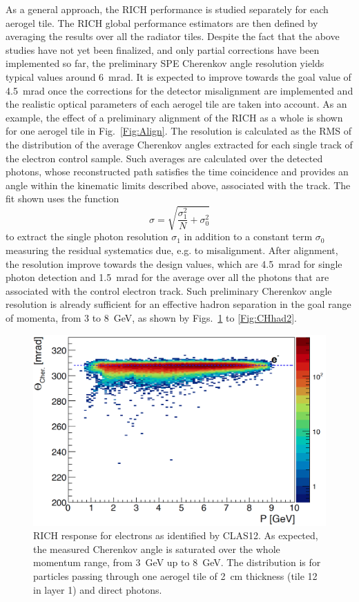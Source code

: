 \documentclass[5p,times,twocolumn]{elsarticle}
\begin{document}
As a general approach, the RICH performance is studied separately for each aerogel tile.
The RICH global performance estimators are then defined by averaging the results over all the
radiator tiles. 
Despite the fact that the above studies have not yet been finalized, and only partial corrections have been
implemented so far, the preliminary SPE Cherenkov angle resolution yields typical values around 6~mrad. It is expected to improve
towards the goal value of 4.5~mrad once the corrections for the detector misalignment are implemented and the
realistic optical parameters of each aerogel tile are taken into account. As an example, the effect of a preliminary
alignment of the RICH as a whole is shown for one aerogel tile in Fig.~\ref{Fig:Align}. The
resolution is calculated as the RMS of the distribution of the average Cherenkov angles extracted for 
each single track of the electron control sample. Such averages are calculated 
over the detected photons, whose reconstructed path satisfies the time coincidence and provides an angle within the 
kinematic limits described above, associated with the track. The fit shown uses the function
$$\sigma = \sqrt{\frac{\sigma_1^2}{N}+\sigma_0^2}$$ to extract the single photon resolution $\sigma_1$ in addition to
a constant term $\sigma_0$ measuring the residual systematics due, e.g. to misalignment.
After alignment, the resolution improve towards
the design values, which are 4.5~mrad for single photon detection and 1.5~mrad for the average over all the photons 
that are associated with the control electron track. Such preliminary Cherenkov angle resolution is already sufficient for an effective hadron
separation in the goal range of momenta, from 3 to 8~GeV, as shown by Figs.~\ref{Fig:CHele} to \ref{Fig:CHhad2}.

\begin{figure}[t]
\begin{center}
\includegraphics[width=1.0\columnwidth]{Electron_PID.png}
\end{center}
\caption{RICH response for electrons as identified by CLAS12. As expected, the measured Cherenkov angle
  is saturated over the whole momentum range, from 3~GeV up to 8~GeV. The distribution is for particles passing
  through one aerogel tile of 2~cm thickness (tile 12 in layer 1) and direct photons.}
\label{Fig:CHele}
\end{figure}
\end{document}
